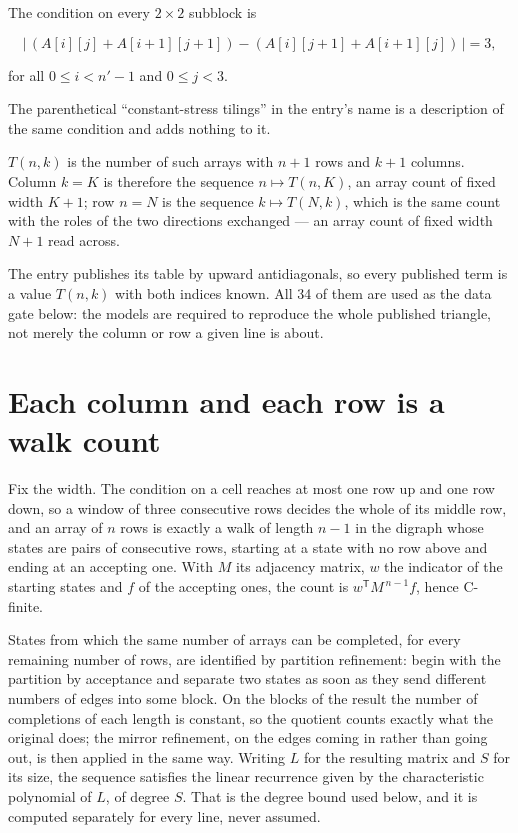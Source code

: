 \documentclass[11pt]{article}
\theoremstyle{definition}
\begin{document}
The condition on every $2 \times 2$ subblock is

\[\bigl|\,(A[i][j] + A[i{+}1][j{+}1]) - (A[i][j{+}1] + A[i{+}1][j])\,\bigr| = 3,\]

for all $0 \le i < n'-1$ and $0 \le j < 3$.

The parenthetical ``constant-stress tilings'' in the entry's name is a description of the same condition and adds nothing to it.

$T(n,k)$ is the number of such arrays with $n + 1$ rows and $k + 1$ columns. Column $k = K$ is therefore the sequence $n \mapsto T(n,K)$, an array count of fixed width $K + 1$; row $n = N$ is the sequence $k \mapsto T(N,k)$, which is the same count with the roles of the two directions exchanged --- an array count of fixed width $N + 1$ read across.

The entry publishes its table by upward antidiagonals, so every published term is a value $T(n,k)$ with both indices known. All 34 of them are used as the data gate below: the models are required to reproduce the whole published triangle, not merely the column or row a given line is about.

\section{Each column and each row is a walk count}

Fix the width. The condition on a cell reaches at most one row up and one row down, so a window of three consecutive rows decides the whole of its middle row, and an array of $n$ rows is exactly a walk of length $n-1$ in the digraph whose states are pairs of consecutive rows, starting at a state with no row above and ending at an accepting one. With $M$ its adjacency matrix, $w$ the indicator of the starting states and $f$ of the accepting ones, the count is $w^{\mathsf T}M^{\,n-1}f$, hence C-finite.

States from which the same number of arrays can be completed, for every remaining number of rows, are identified by partition refinement: begin with the partition by acceptance and separate two states as soon as they send different numbers of edges into some block. On the blocks of the result the number of completions of each length is constant, so the quotient counts exactly what the original does; the mirror refinement, on the edges coming in rather than going out, is then applied in the same way. Writing $L$ for the resulting matrix and $S$ for its size, the sequence satisfies the linear recurrence given by the characteristic polynomial of $L$, of degree $S$. That is the degree bound used below, and it is computed separately for every line, never assumed.
\end{document}

